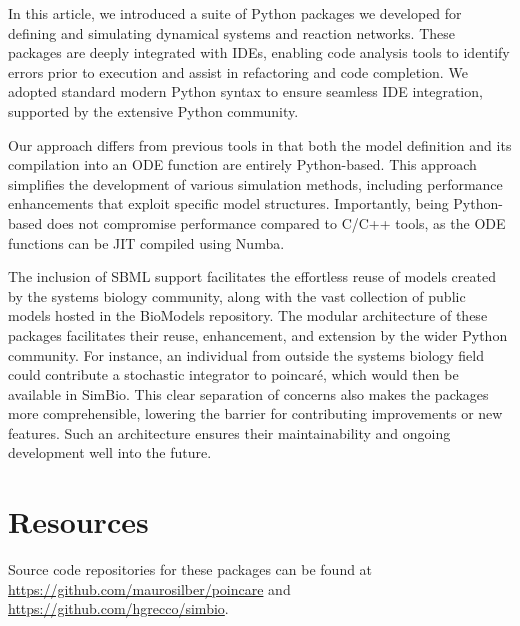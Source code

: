 \documentclass{article}
\begin{document}
In this article, we introduced a suite of Python packages we developed
for defining and simulating dynamical systems and reaction networks.
These packages are deeply integrated with
\acp{IDE}, enabling code analysis tools to identify errors
prior to execution and assist in refactoring and code completion. We
adopted standard modern Python syntax to ensure seamless IDE
integration, supported by the extensive Python community.

Our approach differs from previous tools in that both the model
definition and its compilation into an
\ac{ODE} function are entirely Python-based. This approach simplifies the
development of various simulation methods, including performance
enhancements that exploit specific model structures. Importantly, being
Python-based does not compromise performance compared to C/C++ tools, as
the \ac{ODE} functions can be \ac{JIT} compiled using Numba.

The inclusion of \ac{SBML} support facilitates the effortless reuse of models
created by the systems biology community, along with the vast collection
of public models hosted in the BioModels repository. The modular
architecture of these packages facilitates their reuse, enhancement, and
extension by the wider Python community. For instance, an individual
from outside the systems biology field could contribute a stochastic
integrator to poincaré, which would then be available in SimBio. This
clear separation of concerns also makes the packages more
comprehensible, lowering the barrier for contributing improvements or
new features. Such an architecture ensures their maintainability and
ongoing development well into the future.

\hypertarget{resources}{%
\section{Resources}\label{resources}}

Source code repositories for these packages can be found at
\url{https://github.com/maurosilber/poincare} and
\url{https://github.com/hgrecco/simbio}.



\end{document}
